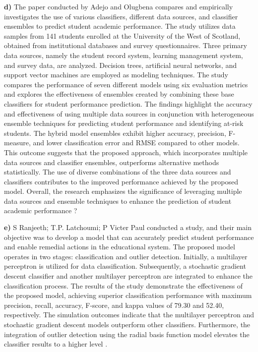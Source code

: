 \documentclass[conference]{IEEEtran}
\begin{document}
\textbf{d)} The paper conducted by Adejo and Olugbena compares and empirically investigates the use of various classifiers, different data sources, and classifier ensembles to predict student academic performance. The study utilizes data samples from 141 students enrolled at the University of the West of Scotland, obtained from institutional databases and survey questionnaires. Three primary data sources, namely the student record system, learning management system, and survey data, are analyzed. Decision trees, artificial neural networks, and support vector machines are employed as modeling techniques.
The study compares the performance of seven different models using six evaluation metrics and explores the effectiveness of ensembles created by combining these base classifiers for student performance prediction. The findings highlight the accuracy and effectiveness of using multiple data sources in conjunction with heterogeneous ensemble techniques for predicting student performance and identifying at-risk students.
The hybrid model ensembles exhibit higher accuracy, precision, F-measure, and lower classification error and RMSE compared to other models. This outcome suggests that the proposed approach, which incorporates multiple data sources and classifier ensembles, outperforms alternative methods statistically. The use of diverse combinations of the three data sources and classifiers contributes to the improved performance achieved by the proposed model. Overall, the research emphasizes the significance of leveraging multiple data sources and ensemble techniques to enhance the prediction of student academic performance \cite{r7}?
\vspace{3mm}

\textbf{e)} S Ranjeeth; T.P. Latchoumi; P Victer Paul conducted a study, and their main objective was to develop a model that can accurately predict student performance and enable remedial actions in the educational system. The proposed model operates in two stages: classification and outlier detection. Initially, a multilayer perceptron is utilized for data classification. Subsequently, a stochastic gradient descent classifier and another multilayer perceptron are integrated to enhance the classification process. The results of the study demonstrate the effectiveness of the proposed model, achieving superior classification performance with maximum precision, recall, accuracy, F-score, and kappa values of 79.30 and 52.40, respectively. The simulation outcomes indicate that the multilayer perceptron and stochastic gradient descent models outperform other classifiers. Furthermore, the integration of outlier detection using the radial basis function model elevates the classifier results to a higher level \cite{r8}.
\vspace{3mm}
\end{document}
